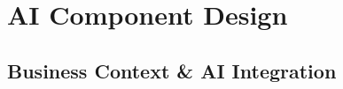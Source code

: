 \chapter{AI Component Design}
\label{chap:ai-component-design}





\section{Business Context \& AI Integration}
\label{section:business-context-ai-integration}

